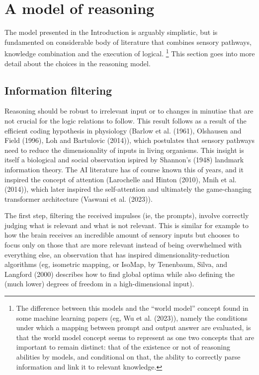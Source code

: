 \documentclass[
]{article}
\begin{document}
\section{A model of reasoning}\label{a-model-of-reasoning}

The model presented in the Introduction is arguably simplistic, but is
fundamented on considerable body of literature that combines sensory
pathways, knowledge combination and the execution of logical.
\footnote{The difference between this models and the ``world model''
  concept found in some machine learning papers (eg, Wu et al. (2023)),
  namely the conditions under which a mapping between prompt and output
  answer are evaluated, is that the world model concept seems to
  represent as one two concepts that are important to remain distinct:
  that of the existence or not of reasoning abilities by models, and
  conditional on that, the ability to correctly parse information and
  link it to relevant knowledge.} This section goes into more detail
about the choices in the reasoning model.

\subsection{Information filtering}\label{information-filtering}

Reasoning should be robust to irrelevant input or to changes in minutiae
that are not crucial for the logic relations to follow. This result
follows as a result of the efficient coding hypothesis in physiology
(Barlow et al. (1961), Olshausen and Field (1996), Loh and Bartulovic
(2014)), which postulates that sensory pathways need to reduce the
dimensionality of inputs in living organisms. This insight is itself a
biological and social observation ispired by Shannon's (1948) landmark
information theory. The AI literature has of course known this of years,
and it inspired the concept of attention (Larochelle and Hinton (2010),
Mnih et al. (2014)), which later inspired the self-attention and
ultimately the game-changing transformer architecture (Vaswani et al.
(2023)).

The first step, filtering the received impulses (ie, the prompts),
involve correctly judging what is relevant and what is not relevant.
This is similar for example to how the brain receives an incredible
amount of sensory inputs but chooses to focus only on those that are
more relevant instead of being overwhelmed with everything else, an
observation that has inspired dimensionality-reduction algorithms (eg,
isometric mapping, or IsoMap, by Tenenbaum, Silva, and Langford (2000)
describes how to find global optima while also defining the (much lower)
degrees of freedom in a high-dimensional input).
\end{document}
